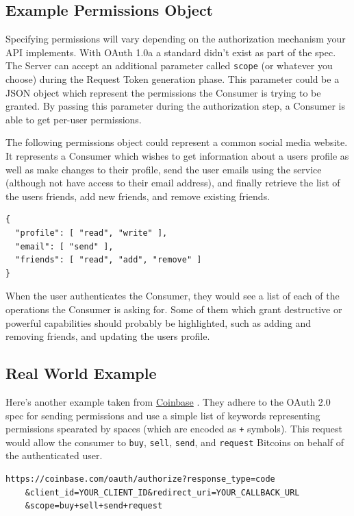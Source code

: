 \documentclass{book}
\begin{document}
\subsection{Example Permissions Object}

Specifying permissions will vary depending on the authorization mechanism your API implements. With OAuth 1.0a a standard didn't exist as part of the spec. The Server can accept an additional parameter called \texttt{scope} (or whatever you choose) during the Request Token generation phase. This parameter could be a JSON object which represent the permissions the Consumer is trying to be granted. By passing this parameter during the authorization step, a Consumer is able to get per-user permissions.

The following permissions object could represent a common social media website. It represents a Consumer which wishes to get information about a users profile as well as make changes to their profile, send the user emails using the service (although not have access to their email address), and finally retrieve the list of the users friends, add new friends, and remove existing friends.

\begin{verbatim}
{
  "profile": [ "read", "write" ],
  "email": [ "send" ],
  "friends": [ "read", "add", "remove" ]
}
\end{verbatim}

When the user authenticates the Consumer, they would see a list of each of the operations the Consumer is asking for. Some of them which grant destructive or powerful capabilities should probably be highlighted, such as adding and removing friends, and updating the users profile.

\subsection{Real World Example}

Here's another example taken from \href{https://coinbase.com/docs/api/authentication#permissions}{Coinbase} \cite{COINBASE}. They adhere to the OAuth 2.0 spec for sending permissions and use a simple list of keywords representing permissions spearated by spaces (which are encoded as \texttt{+} symbols). This request would allow the consumer to \texttt{buy}, \texttt{sell}, \texttt{send}, and \texttt{request} Bitcoins on behalf of the authenticated user.

\begin{verbatim}
https://coinbase.com/oauth/authorize?response_type=code
    &client_id=YOUR_CLIENT_ID&redirect_uri=YOUR_CALLBACK_URL
    &scope=buy+sell+send+request
\end{verbatim}
\end{document}
